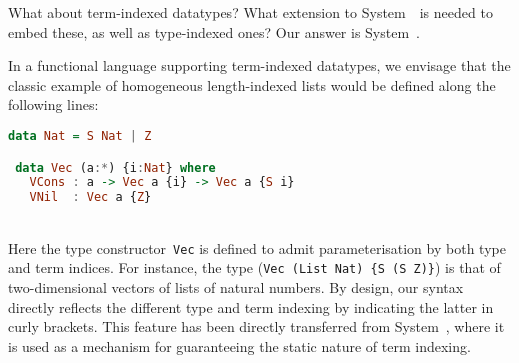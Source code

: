 
What about term-indexed datatypes?  What extension to System~\Fw\ is
needed to embed these, as well as type-indexed ones?  Our answer is
System~\Fi.

In a functional language supporting term-indexed datatypes, we envisage
that the classic example of homogeneous length-indexed lists would be
defined along the following lines:\vspace{-5pt}
\begin{lstlisting}[basicstyle={\ttfamily},language=Haskell]
 data Nat = S Nat | Z 

 data Vec (a:*) {i:Nat} where
   VCons : a -> Vec a {i} -> Vec a {S i}
   VNil  : Vec a {Z}
\end{lstlisting}~\vspace{-15pt}\\ \noindent
Here the type constructor~{\tt Vec} is defined to admit parameterisation
by both type and term indices.  For instance, the type 
(\verb|Vec (List Nat) {S (S Z)}|) is that of two-dimensional
vectors of lists of natural numbers.  By design, our syntax directly
reflects the different type and term indexing by indicating the latter in
curly brackets.  This feature has been directly transferred from
System~\Fi, where it is used as a mechanism for guaranteeing the static
nature of term indexing.

